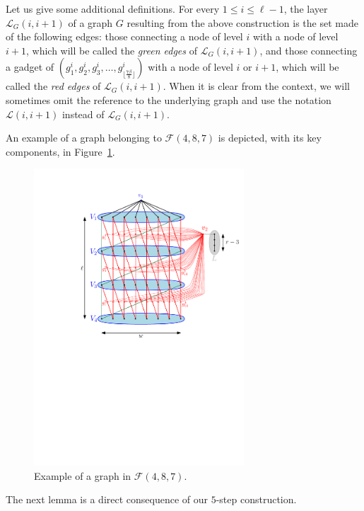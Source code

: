 \documentclass[11pt]{article}
\begin{document}
Let us give some additional definitions. For every $1\leq i \leq \ell-1$, the layer $\mathcal{L}_G(i,i+1)$ of a graph $G$ resulting from the above construction is the set made of the following edges: those connecting a node of level $i$ with a node of level $i+1$, which will be called the \emph{green edges} of $\mathcal{L}_G(i,i+1)$, and those connecting a gadget of $(g^i_1,g^i_2,g^i_3,\ldots,g^i_{\lfloor\frac{7\beta}{8}\rfloor})$ with a node of level $i$ or $i+1$, which will be called the \emph{red edges} of $\mathcal{L}_G(i,i+1)$. When it is clear from the context, we will sometimes omit the reference to the underlying graph and use the notation $\mathcal{L}(i,i+1)$ instead of $\mathcal{L}_G(i,i+1)$. 

An example of a graph belonging to $\mathcal{F}(4,8,7)$ is depicted, with its key components, in Figure~\ref{fig:example}.


\begin{figure}[!t]
    \centering
    \includegraphics[width=0.7\textwidth]{images/F487.pdf}
    \caption{Example of a graph in $\mathcal{F}(4,8,7)$.}
    \label{fig:example}
\end{figure}

The next lemma is a direct consequence of our $5$-step construction.
\end{document}

